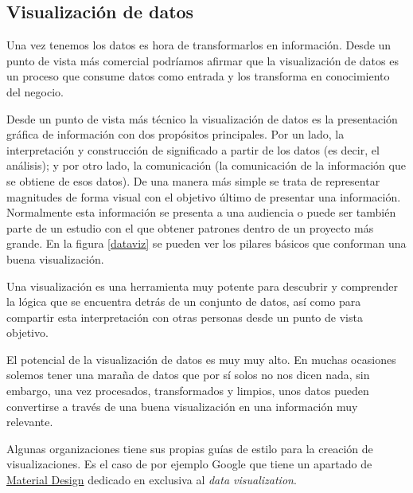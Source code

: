 \subsection{Visualización de datos}
Una vez tenemos los datos es hora de transformarlos en información. Desde un punto de vista más comercial podríamos afirmar que la visualización de datos es un proceso que consume datos como entrada y los transforma en conocimiento del negocio. 

Desde un punto de vista más técnico la visualización de datos es la presentación gráfica de información con dos propósitos principales. Por un lado, la interpretación y construcción de significado a partir de los datos (es decir, el análisis); y por otro lado, la comunicación (la comunicación de la información que se obtiene de esos datos). De una manera más simple se trata de representar magnitudes de forma visual con el objetivo último de presentar una información. Normalmente esta información se presenta a una audiencia o puede ser también parte de un estudio con el que obtener patrones  dentro de un proyecto más grande.  En la figura \ref{dataviz} se pueden ver los pilares básicos que conforman una buena visualización.


Una  visualización es una herramienta muy potente para descubrir y comprender la lógica que se encuentra detrás de un conjunto de datos, así como para compartir esta interpretación con otras personas desde un punto de vista objetivo.

El potencial de la visualización de datos es muy muy alto. En muchas ocasiones solemos tener una maraña de datos que por sí solos no nos dicen nada, sin embargo, una vez procesados, transformados y limpios, unos datos pueden convertirse a través de una buena visualización en una información muy relevante.

Algunas organizaciones \cite{cesal_what_2019} tiene sus propias guías de estilo para la creación de visualizaciones. Es el caso de por ejemplo Google que tiene un apartado de \href{https://material.io/design/communication/data-visualization.html#types}{Material Design} dedicado en exclusiva al \textit{data visualization}.
